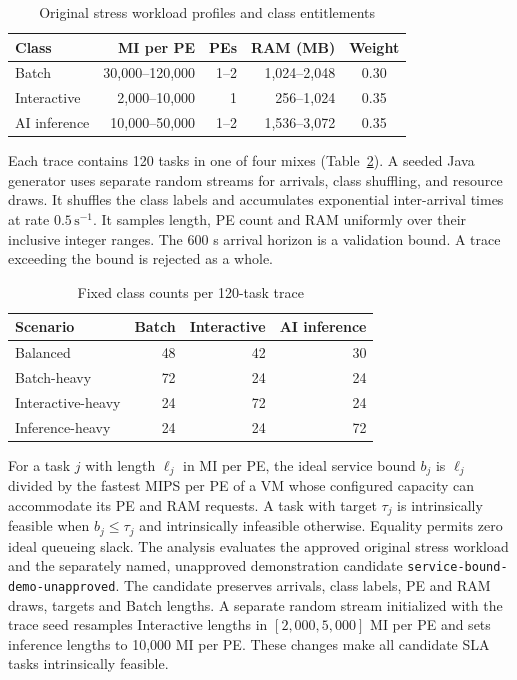 \documentclass[conference]{IEEEtran}
\begin{document}
\begin{table}[t]
\caption{Original stress workload profiles and class entitlements}
\label{tab:profiles}
\centering
\begin{tabular}{@{}lrrrc@{}}
\toprule
Class & MI per PE & PEs & RAM (MB) & Weight\\
\midrule
Batch & 30,000--120,000 & 1--2 & 1,024--2,048 & 0.30\\
Interactive & 2,000--10,000 & 1 & 256--1,024 & 0.35\\
AI inference & 10,000--50,000 & 1--2 & 1,536--3,072 & 0.35\\
\bottomrule
\end{tabular}
\end{table}

Each trace contains 120 tasks in one of four mixes (Table~\ref{tab:mixes}). A seeded Java generator uses separate random streams for arrivals, class shuffling, and resource draws. It shuffles the class labels and accumulates exponential inter-arrival times at rate $0.5\,\mathrm{s}^{-1}$. It samples length, PE count and RAM uniformly over their inclusive integer ranges. The 600 s arrival horizon is a validation bound. A trace exceeding the bound is rejected as a whole.

\begin{table}[t]
\caption{Fixed class counts per 120-task trace}
\label{tab:mixes}
\centering
\begin{tabular}{@{}lrrr@{}}
\toprule
Scenario & Batch & Interactive & AI inference\\
\midrule
Balanced & 48 & 42 & 30\\
Batch-heavy & 72 & 24 & 24\\
Interactive-heavy & 24 & 72 & 24\\
Inference-heavy & 24 & 24 & 72\\
\bottomrule
\end{tabular}
\end{table}

For a task $j$ with length $\ell_j$ in MI per PE, the ideal service bound $b_j$ is $\ell_j$ divided by the fastest MIPS per PE of a VM whose configured capacity can accommodate its PE and RAM requests. A task with target $\tau_j$ is intrinsically feasible when $b_j\leq\tau_j$ and intrinsically infeasible otherwise. Equality permits zero ideal queueing slack. The analysis evaluates the approved original stress workload and the separately named, unapproved demonstration candidate \texttt{service-bound-demo-unapproved}. The candidate preserves arrivals, class labels, PE and RAM draws, targets and Batch lengths. A separate random stream initialized with the trace seed resamples Interactive lengths in $[2{,}000,5{,}000]$ MI per PE and sets inference lengths to 10,000 MI per PE. These changes make all candidate SLA tasks intrinsically feasible.
\end{document}
